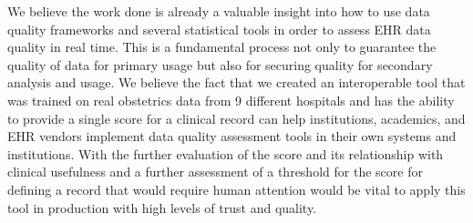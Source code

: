 
We believe the work done is already a valuable insight into how to use data quality frameworks and several statistical tools in order to assess EHR data quality in real time. This is a fundamental process not only to guarantee the quality of data for primary usage but also for securing quality for secondary analysis and usage. We believe the fact that we created an interoperable tool that was trained on real obstetrics data from 9 different hospitals and has the ability to provide a single score for a clinical record can help institutions, academics, and EHR vendors implement data quality assessment tools in their own systems and institutions. With the further evaluation of the score and its relationship with clinical usefulness and a further assessment of a threshold for the score for defining a record that would require human attention would be vital to apply this tool in production with high levels of trust and quality.